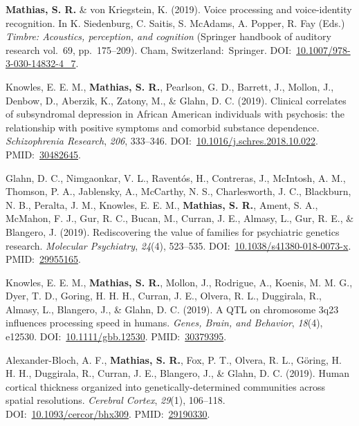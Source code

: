 \documentclass[10pt]{article}
\makeatletter
\newlength{\bibhang}
\newlength{\bibsep}
 {\@listi \global\bibsep\itemsep \global\advance\bibsep by\parsep}
\newenvironment{bibsection}%
        {\vspace{-\baselineskip}\begin{list}{}{%
       \setlength{\leftmargin}{\bibhang}%
       \setlength{\itemindent}{-\leftmargin}%
       \setlength{\itemsep}{\bibsep}%
       \setlength{\parsep}{\z@}%
        \setlength{\partopsep}{0pt}%
        \setlength{\topsep}{0pt}}}
        {\end{list}\vspace{-.6\baselineskip}}
\makeatother
\begin{document}
\begin{bibsection}
\item \textbf{Mathias, S. R.} \& von Kriegstein, K. (2019). Voice processing and voice-identity recognition. In K. Siedenburg, C. Saitis, S. McAdams, A. Popper, R. Fay (Eds.) \emph{Timbre: Acoustics, perception, and cognition} (Springer handbook of auditory research vol.~69, pp.~175--209). Cham, Switzerland:~Springer. DOI:~\href{https://doi.org/10.1007/978-3-030-14832-4_7}{10.1007/978-3-030-14832-4\_7}.

\item Knowles, E. E. M., \textbf{Mathias, S. R.}, Pearlson, G. D., Barrett, J., Mollon, J., Denbow, D., Aberzik, K., Zatony, M., \& Glahn, D. C. (2019). Clinical correlates of subsyndromal depression in African American individuals with psychosis: the relationship with positive symptoms and comorbid substance dependence. \emph{Schizophrenia Research}, \emph{206}, 333--346. DOI:~\href{https://doi.org/10.1016/j.schres.2018.10.022}{10.1016/j.schres.2018.10.022}. PMID:~\href{https://www.ncbi.nlm.nih.gov/pubmed/?term=30482645}{30482645}.
\item Glahn, D. C., Nimgaonkar, V. L., Raventós, H., Contreras, J., McIntosh, A. M., Thomson, P. A., Jablensky, A., McCarthy, N. S., Charlesworth, J. C., Blackburn, N. B., Peralta, J. M., Knowles, E. E. M., \textbf{Mathias, S. R.}, Ament, S. A., McMahon, F. J., Gur, R. C., Bucan, M., Curran, J. E., Almasy, L., Gur, R. E., \& Blangero, J. (2019). Rediscovering the value of families for psychiatric genetics research. \emph{Molecular Psychiatry}, \emph{24}(4), 523--535. DOI:~\href{https://doi.org/10.1038/s41380-018-0073-x}{10.1038/s41380-018-0073-x}. PMID:~\href{https://www.ncbi.nlm.nih.gov/pubmed/?term=29955165}{29955165}.

\item Knowles, E. E. M., \textbf{Mathias, S. R.}, Mollon, J., Rodrigue, A., Koenis, M. M. G., Dyer, T. D., Goring, H. H. H., Curran, J. E., Olvera, R. L., Duggirala, R., Almasy, L., Blangero, J., \& Glahn, D. C. (2019). A QTL on chromosome 3q23 influences processing speed in humans. \emph{Genes, Brain, and Behavior}, \emph{18}(4), e12530. DOI:~\href{https://doi.org/10.1111/gbb.12530}{10.1111/gbb.12530}. PMID:~\href{https://www.ncbi.nlm.nih.gov/pubmed/?term=30379395}{30379395}.

\item Alexander-Bloch, A. F., \textbf{Mathias, S. R.}, Fox, P. T., Olvera, R. L., Göring, H. H. H., Duggirala, R., Curran, J. E., Blangero, J., \& Glahn, D. C. (2019). Human cortical thickness organized into genetically-determined communities across spatial resolutions. \emph{Cerebral Cortex}, \emph{29}(1), 106--118. DOI:~\href{https://doi.org/10.1093/cercor/bhx309}{10.1093/cercor/bhx309}. PMID:~\href{https://www.ncbi.nlm.nih.gov/pubmed/?term=29190330}{29190330}.


\end{bibsection}
\end{document}
